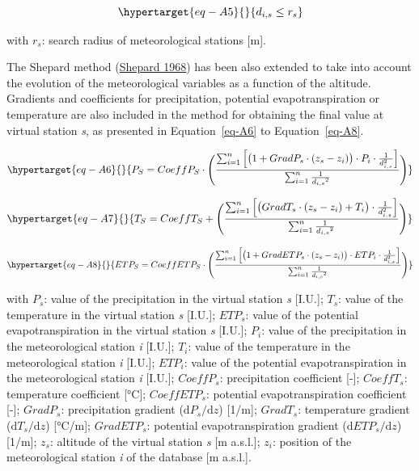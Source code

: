 \documentclass[
  letterpaper,
  DIV=11,
  numbers=noendperiod]{scrreprt}
\begin{document}
\begin{equation}\protect\hypertarget{eq-A5}{}{
d_{i,s} \leq r_s
}\label{eq-A5}\end{equation}

with \(r_s\): search radius of meteorological stations {[}m{]}.

The Shepard method
(\protect\hyperlink{ref-shepard_two-dimensional_1968}{Shepard 1968}) has
been also extended to take into account the evolution of the
meteorological variables as a function of the altitude. Gradients and
coefficients for precipitation, potential evapotranspiration or
temperature are also included in the method for obtaining the final
value at virtual station \emph{s}, as presented in Equation~\ref{eq-A6}
to Equation~\ref{eq-A8}.

\begin{equation}\protect\hypertarget{eq-A6}{}{
P_S=CoeffP_S \cdot \Bigg(\frac{\sum_{i=1}^{n} \Big[ \big( 1 + GradP_s \cdot (z_s-z_i) \big) \cdot P_i \cdot {\frac {1}{d_{i,s}^2}} \Big]}{\sum_{i=1}^{n} \frac{1}{{d_{i,s}}^2}} \Bigg)
}\label{eq-A6}\end{equation}

\begin{equation}\protect\hypertarget{eq-A7}{}{
T_S=CoeffT_S + \Bigg(\frac{\sum_{i=1}^{n} \Big[\big(GradT_s \cdot (z_s-z_i) + T_i\big) \cdot {\frac {1}{d_{i,s}^2}} \Big]}{\sum_{i=1}^{n} \frac{1}{{d_{i,s}}^2}} \Bigg)
}\label{eq-A7}\end{equation}

\begin{equation}\protect\hypertarget{eq-A8}{}{
ETP_S=CoeffETP_S \cdot \Bigg(\frac{\sum_{i=1}^{n} \Big[\big( 1 + GradETP_s \cdot (z_s-z_i) \big) \cdot ETP_i \cdot {\frac {1}{d_{i,s}^2}} \Big]}{\sum_{i=1}^{n} \frac{1}{{d_{i,s}}^2}} \Bigg)
}\label{eq-A8}\end{equation}

with \(P_s\): value of the precipitation in the virtual station \emph{s}
{[}I.U.{]}; \(T_s\): value of the temperature in the virtual station
\emph{s} {[}I.U.{]}; \(ETP_s\): value of the potential
evapotranspiration in the virtual station \emph{s} {[}I.U.{]}; \(P_i\):
value of the precipitation in the meteorological station \emph{i}
{[}I.U.{]}; \(T_i\): value of the temperature in the meteorological
station \emph{i} {[}I.U.{]}; \(ETP_i\): value of the potential
evapotranspiration in the meteorological station \emph{i} {[}I.U.{]};
\(CoeffP_s\): precipitation coefficient {[}-{]}; \(CoeffT_s\):
temperature coefficient {[}°C{]}; \(CoeffETP_s\): potential
evapotranspiration coefficient {[}-{]}; \(GradP_s\): precipitation
gradient (\(\mathrm{d}P_s/\mathrm{d}z\)) {[}1/m{]}; \(GradT_s\):
temperature gradient (\(\mathrm{d}T_s/\mathrm{d}z\)) {[}°C/m{]};
\(GradETP_s\): potential evapotranspiration gradient
(\(\mathrm{d}ETP_s/\mathrm{d}z\)) {[}1/m{]}; \(z_s\): altitude of the
virtual station \emph{s} {[}m a.s.l.{]}; \(z_i\): position of the
meteorological station \emph{i} of the database {[}m a.s.l.{]}.
\end{document}
